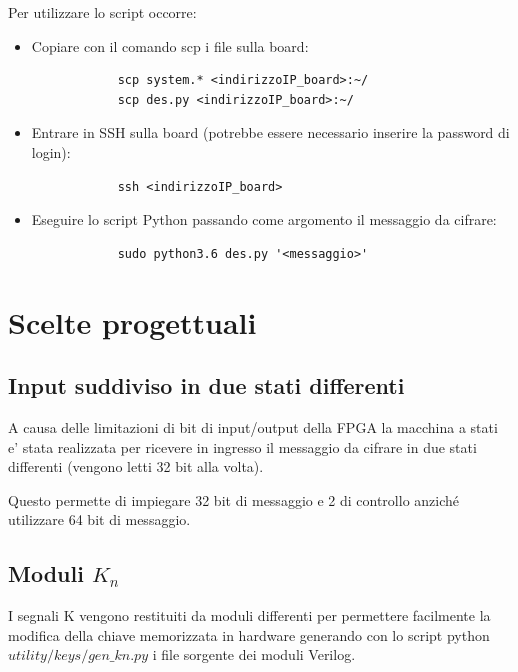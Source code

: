 \documentclass[a4paper]{article}
\begin{document}
Per utilizzare lo script occorre:
\begin{itemize}
    \item Copiare con il comando scp i file sulla board:

          \begin{verbatim}
            scp system.* <indirizzoIP_board>:~/
            scp des.py <indirizzoIP_board>:~/
          \end{verbatim}
    \item Entrare in SSH sulla board (potrebbe essere necessario inserire la password di login):

          \begin{verbatim}
            ssh <indirizzoIP_board>
          \end{verbatim}
    \item Eseguire lo script Python passando come argomento il messaggio da cifrare:
          \begin{verbatim}
            sudo python3.6 des.py '<messaggio>'
          \end{verbatim}
\end{itemize}

\section{Scelte progettuali}

\subsection{Input suddiviso in due stati differenti}
A causa delle limitazioni di bit di input/output della FPGA la macchina a stati e' stata realizzata per ricevere in ingresso il messaggio da cifrare in due stati differenti (vengono letti 32 bit alla volta).

Questo permette di impiegare 32 bit di messaggio e 2 di controllo anziché utilizzare 64 bit di messaggio.

\subsection{Moduli $K_n$}
I segnali K vengono restituiti da moduli differenti per permettere 
facilmente la modifica della chiave memorizzata in hardware
generando con lo script python $utility/keys/gen\_kn.py$ i file 
sorgente dei moduli Verilog.
\end{document}
